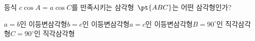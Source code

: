 등식 $c\cos A=a\cos C$를 만족시키는 삼각형~$\pt{ABC}$는 어떤 삼각형인가?
\begin{choicesii}{$a=b$인 이등변삼각형}{$b=c$인 이등변삼각형}{$a=c$인 이등변삼각형}{$B=90^\circ$인 직각삼각형}{$C=90^\circ$인 직각삼각형}\end{choicesii}
